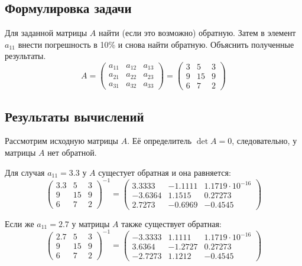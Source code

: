 \documentclass[12pt]{article}%
\begin{document}
\subsection{Формулировка задачи}
Для заданной матрицы $A$ найти (если это возможно) обратную. Затем в элемент $a_{11}$ внести погрешность в 10\% и снова найти обратную. Объяснить полученные результаты. 
\[
A = 
\begin{pmatrix}
    a_{11} & a_{12} & a_{13} \\
    a_{21} & a_{22} & a_{23} \\
    a_{31} & a_{32} & a_{33}
\end{pmatrix} =
\begin{pmatrix}
    3 & 5 & 3 \\
    9 & 15 & 9 \\
    6 & 7 & 2
\end{pmatrix}
\]


\subsection{Результаты вычислений}
Рассмотрим исходную матрицы $A$. Её определитель $\det A = 0$, следовательно, у матрицы $A$ нет обратной.

Для случая $a_{11} = 3.3$ у $A$ сущестует обратная и она равняется:
\begin{equation*}
    \begin{pmatrix}
        3.3 & 5 & 3  \\
        9 & 15 & 9   \\
        6 & 7  & 2
    \end{pmatrix}^{-1} = 
    \begin{pmatrix}
        3.3333 & -1.1111 & 1.1719\cdot10^{-16} \\
        -3.6364 &  1.1515 & 0.27273             \\
        2.7273 & -0.6969 & -0.4545
    \end{pmatrix}
\end{equation*}

Если же $a_{11} = 2.7$ у матрицы $A$ также существует обратная:
\begin{equation*}
   \begin{pmatrix}
        2.7 & 5 & 3  \\
        9 & 15 & 9   \\
        6 & 7  & 2
    \end{pmatrix}^{-1} =
    \begin{pmatrix}
        -3.3333 & 1.1111  & 1.1719\cdot10^{-16} \\
        3.6364  & -1.2727 & 0.27273             \\
        -2.7273 & 1.1212  & -0.4545
    \end{pmatrix}
\end{equation*}
\end{document}
